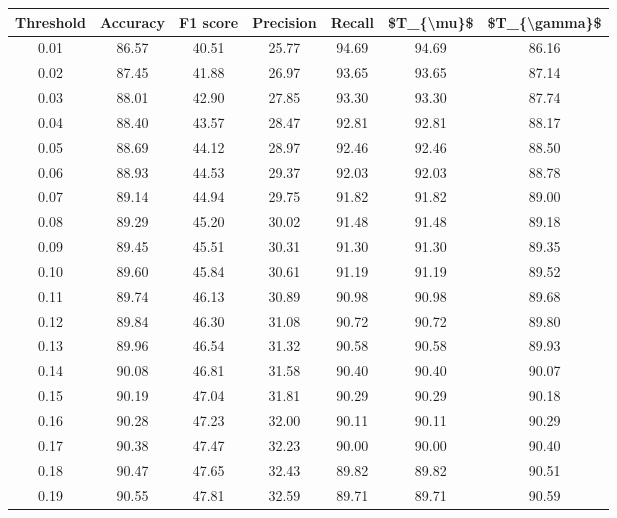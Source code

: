 \begin{tabular}{|c|c|c|c|c|c|c|}
\hline
 Threshold &  Accuracy &  F1 score &  Precision &  Recall &  \$T\_\{\textbackslash mu\}\$ &  \$T\_\{\textbackslash gamma\}\$ \\
\hline
      0.01 &     86.57 &     40.51 &      25.77 &   94.69 &      94.69 &         86.16 \\
      0.02 &     87.45 &     41.88 &      26.97 &   93.65 &      93.65 &         87.14 \\
      0.03 &     88.01 &     42.90 &      27.85 &   93.30 &      93.30 &         87.74 \\
      0.04 &     88.40 &     43.57 &      28.47 &   92.81 &      92.81 &         88.17 \\
      0.05 &     88.69 &     44.12 &      28.97 &   92.46 &      92.46 &         88.50 \\
      0.06 &     88.93 &     44.53 &      29.37 &   92.03 &      92.03 &         88.78 \\
      0.07 &     89.14 &     44.94 &      29.75 &   91.82 &      91.82 &         89.00 \\
      0.08 &     89.29 &     45.20 &      30.02 &   91.48 &      91.48 &         89.18 \\
      0.09 &     89.45 &     45.51 &      30.31 &   91.30 &      91.30 &         89.35 \\
      0.10 &     89.60 &     45.84 &      30.61 &   91.19 &      91.19 &         89.52 \\
      0.11 &     89.74 &     46.13 &      30.89 &   90.98 &      90.98 &         89.68 \\
      0.12 &     89.84 &     46.30 &      31.08 &   90.72 &      90.72 &         89.80 \\
      0.13 &     89.96 &     46.54 &      31.32 &   90.58 &      90.58 &         89.93 \\
      0.14 &     90.08 &     46.81 &      31.58 &   90.40 &      90.40 &         90.07 \\
      0.15 &     90.19 &     47.04 &      31.81 &   90.29 &      90.29 &         90.18 \\
      0.16 &     90.28 &     47.23 &      32.00 &   90.11 &      90.11 &         90.29 \\
      0.17 &     90.38 &     47.47 &      32.23 &   90.00 &      90.00 &         90.40 \\
      0.18 &     90.47 &     47.65 &      32.43 &   89.82 &      89.82 &         90.51 \\
      0.19 &     90.55 &     47.81 &      32.59 &   89.71 &      89.71 &         90.59 \\

\end{tabular}
